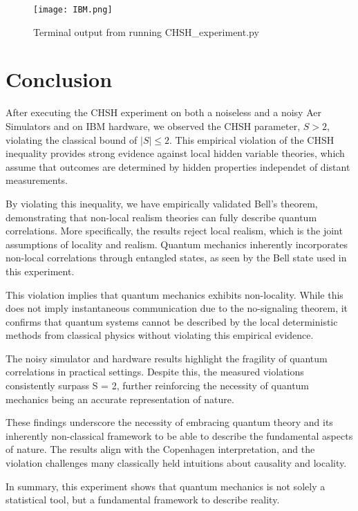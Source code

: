\documentclass[12pt]{article}
\begin{document}
\begin{figure}[h]
    \centering
    \texttt{[image: IBM.png]}
    \caption{Terminal output from running CHSH\_experiment.py}
    \label{fig:results}
\end{figure}

\newpage
\section{Conclusion}
After executing the CHSH experiment on both a noiseless and a noisy Aer Simulators and on IBM hardware, we observed the CHSH parameter, \( S > 2 \), violating the classical bound of \( |S| \leq 2 \). This empirical violation of the CHSH inequality provides strong evidence against local hidden variable theories, which assume that outcomes are determined by hidden properties independet of distant measurements. 

By violating this inequality, we have empirically validated Bell's theorem, demonstrating that non-local realism theories can fully describe quantum correlations. More specifically, the results reject local realism, which is the joint assumptions of locality and realism. Quantum mechanics inherently incorporates non-local correlations through entangled states, as seen by the Bell state used in this experiment.

This violation implies that quantum mechanics exhibits non-locality. While this does not imply instantaneous communication due to the no-signaling theorem, it confirms that quantum systems cannot be described by the local deterministic methods from classical physics without violating this empirical evidence.

The noisy simulator and hardware results highlight the fragility of quantum correlations in practical settings. Despite this, the measured violations consistently surpass S = 2, further reinforcing the necessity of quantum mechanics being an accurate representation of nature.

These findings underscore the necessity of embracing quantum theory and its inherently non-classical framework to be able to describe the fundamental aspects of nature. The results align with the Copenhagen interpretation, and the violation challenges many classically held intuitions about causality and locality. 

In summary, this experiment shows that quantum mechanics is not solely a statistical tool, but a fundamental framework to describe reality. 
\end{document}
